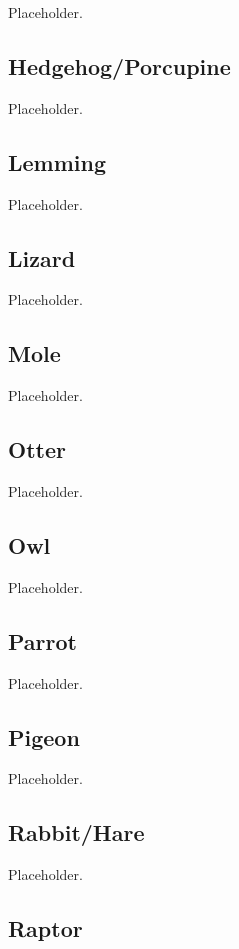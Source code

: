 Placeholder.

\subsection{Hedgehog/Porcupine}

Placeholder.

\subsection{Lemming}

Placeholder.

\subsection{Lizard}

Placeholder.

\subsection{Mole}

Placeholder.

\subsection{Otter}

Placeholder.

\subsection{Owl}

Placeholder.

\subsection{Parrot}

Placeholder.

\subsection{Pigeon}

Placeholder.

\subsection{Rabbit/Hare}

Placeholder.

\subsection{Raptor}


